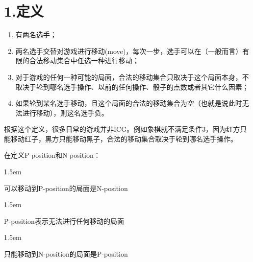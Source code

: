 \documentclass{article}
\begin{document}
\section{1.\hspace*{0.5em}定义}\label{section}%

\begin{enumerate}[noitemsep,topsep=\mdcompacttopsep]%

\item{}有两名选手；%

\item{}两名选手交替对游戏进行移动(move)，每次一步，选手可以在（一般而言）有限的合法移动集合中任选一种进行移动；%

\item{}对于游戏的任何一种可能的局面，合法的移动集合只取决于这个局面本身，不取决于轮到哪名选手操作、以前的任何操作、骰子的点数或者其它什么因素；%

\item{}如果轮到某名选手移动，且这个局面的合法的移动集合为空（也就是说此时无法进行移动），则这名选手负。%
\end{enumerate}%

\noindent{}根据这个定义，很多日常的游戏并非ICG。例如象棋就不满足条件3，因为红方只能移动红子，黑方只能移动黑子，合法的移动集合取决于轮到哪名选手操作。%

在定义P-position和N-position：%

\begin{mddefinitions}%


\begin{mdbmarginx}{}{}{}{1.5em}%
\begin{mddefdata}%
可以移动到P-position的局面是N-position
\end{mddefdata}%
\end{mdbmarginx}%

\begin{mdbmarginx}{}{}{}{1.5em}%
\begin{mddefdata}%
P-position表示无法进行任何移动的局面
\end{mddefdata}%
\end{mdbmarginx}%


\begin{mdbmarginx}{}{}{}{1.5em}%
\begin{mddefdata}%
只能移动到N-position的局面是P-position%
\end{mddefdata}%
\end{mdbmarginx}%
\end{mddefinitions}%
\end{document}
